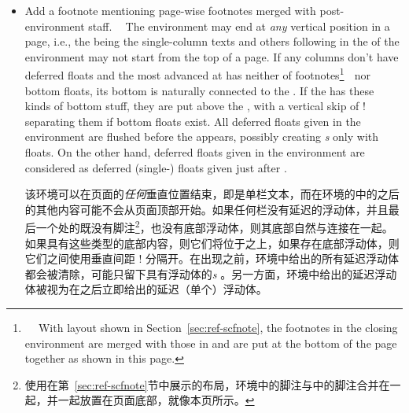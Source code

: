 \begin{description}
\begin{itemize}
所有栏中的 \Uidx\lcounter{} 都被初始化为\beginparacol{}第一次出现时的值。在\beginparacol{}的第二次及后续出现中，每个栏中的\lcounter{}都具有上一个\Endparacol{}处的值，除非在\Endparacol{}之后对其进行了修改。如果在\Endparacol{}之后修改了计数器（或通过 \!\newcounter! 声明了计数器），所有栏中的局部计数器都通常具有\beginparacol{}处的值。

\item
{}
{Add a footnote mentioning page-wise footnotes merged with
    post-environment staff.}

The environment may end at \emph{any} vertical position in a page, i.e.,
the {\em\Uidx\postenv} being the single-column texts and others
following \Endparacol{} in the {\em\Uidx\lpage} of the environment may not
start from the top of a page.  If any columns don't have deferred
\cwise{} floats and the most advanced {\em\Uidx\lcolumn} at
\Endparacol{} has neither of footnotes\footnote{

With \Mgfnote{} layout shown in Section~\ref{sec:ref-scfnote}, the
footnotes in the closing  environment are merged with those
in \postenv{} and are put at the bottom of the page{} together as shown in
this page.}

nor bottom floats, its bottom is naturally connected to the \postenv{}.
If the \lcolumn{} has these kinds of bottom stuff, they are put above the
\postenv{}, with a vertical skip of \!\textfloatsep! separating them if
bottom floats exist.  All deferred \cwise{} floats given in the
environment are flushed before the \postenv{} appears, possibly creating
{\em\Uidx\fcolumn{}s} only with floats.  On the other hand, deferred
\pwise{} floats given in the environment are considered as deferred
(single-) \cwise{} floats given just after \Endparacol.


该环境可以在页面的\emph{任何}垂直位置结束，即\emph{\Uidx\postenv}是单栏文本，而在环境的\emph{\Uidx\lpage}中的\Endparacol{}之后的其他内容可能不会从页面顶部开始。如果任何栏没有延迟的\cwise{}浮动体，并且最后一个\Endparacol{}处的\emph{\Uidx\lcolumn}既没有脚注\footnote{使用在第~\ref{sec:ref-scfnote}节中展示的\Mgfnote{}布局，环境中的脚注与\postenv{}中的脚注合并在一起，并一起放置在页面底部，就像本页所示。}，也没有底部浮动体，则其底部自然与\postenv{}连接在一起。如果\lcolumn{}具有这些类型的底部内容，则它们将位于\postenv{}之上，如果存在底部浮动体，则它们之间使用垂直间距 \!\textfloatsep! 分隔开。在\postenv{}出现之前，环境中给出的所有延迟\cwise{}浮动体都会被清除，可能只留下具有浮动体的{\em\Uidx\fcolumn{}s} 。另一方面，环境中给出的延迟\pwise{}浮动体被视为在\Endparacol{}之后立即给出的延迟（单个）\cwise{}浮动体。


\end{itemize}
\end{description}
